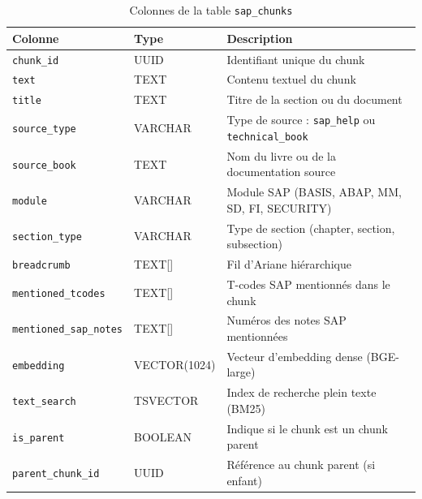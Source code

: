\begin{table}[H]
\centering
\caption{Colonnes de la table \texttt{sap\_chunks}}
\label{tab:sap_chunks}

\begin{tabularx}{\textwidth}{|l|l|X|}
\hline
\textbf{Colonne} & \textbf{Type} & \textbf{Description} \\
\hline

\texttt{chunk\_id} &
UUID &
Identifiant unique du chunk \\
\hline

\texttt{text} &
TEXT &
Contenu textuel du chunk \\
\hline

\texttt{title} &
TEXT &
Titre de la section ou du document \\
\hline

\texttt{source\_type} &
VARCHAR &
Type de source : \texttt{sap\_help} ou \texttt{technical\_book} \\
\hline

\texttt{source\_book} &
TEXT &
Nom du livre ou de la documentation source \\
\hline

\texttt{module} &
VARCHAR &
Module SAP (BASIS, ABAP, MM, SD, FI, SECURITY) \\
\hline

\texttt{section\_type} &
VARCHAR &
Type de section (chapter, section, subsection) \\
\hline

\texttt{breadcrumb} &
TEXT[] &
Fil d'Ariane hiérarchique \\
\hline

\texttt{mentioned\_tcodes} &
TEXT[] &
T-codes SAP mentionnés dans le chunk \\
\hline

\texttt{mentioned\_sap\_notes} &
TEXT[] &
Numéros des notes SAP mentionnées \\
\hline

\texttt{embedding} &
VECTOR(1024) &
Vecteur d'embedding dense (BGE-large) \\
\hline

\texttt{text\_search} &
TSVECTOR &
Index de recherche plein texte (BM25) \\
\hline

\texttt{is\_parent} &
BOOLEAN &
Indique si le chunk est un chunk parent \\
\hline

\texttt{parent\_chunk\_id} &
UUID &
Référence au chunk parent (si enfant) \\
\hline

\end{tabularx}
\end{table}
